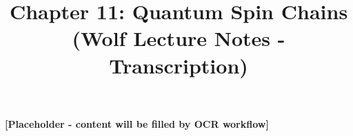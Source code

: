 \documentclass{article}
\title{Chapter 11: Quantum Spin Chains \\ {\small (Wolf Lecture Notes - Transcription)}}
\date{}
\begin{document}
\maketitle
\tableofcontents

\textbf{[Placeholder - content will be filled by OCR workflow]}
\end{document}
